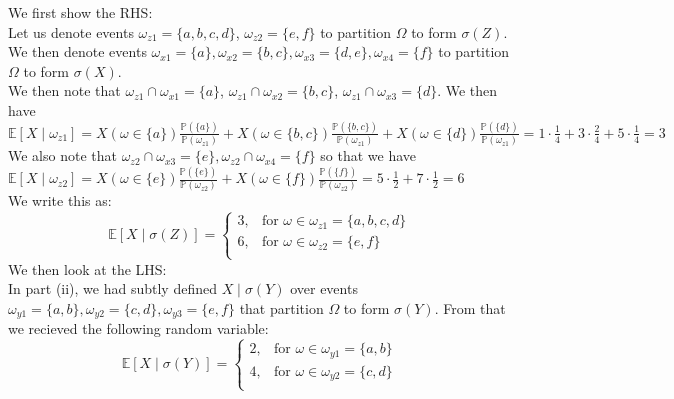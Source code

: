 \documentclass[12pt,twoside, letter]{exam}
\theoremstyle{definition}
\newcommand{\ee}{\mathbb{E}}
\newcommand{\pp}{\mathbb{P}}
\begin{document}
\begin{enumerate}
    \begin{solution}
      We first show the RHS: \\
      Let us denote events $\omega_{z1} = \{a,b,c,d\}$, $\omega_{z2} = \{e,f\}$ to partition $\Omega$ to form $\sigma(Z)$.
      We then denote events $\omega_{x1} = \{a\}, \omega_{x2} = \{b,c\}, \omega_{x3} = \{d,e\}, \omega_{x4} = \{f\}$ to partition $\Omega$ to form $\sigma(X)$. \\
      We then note that $\omega_{z1}\cap\omega_{x1} = \{a\}$, $\omega_{z1}\cap\omega_{x2} = \{b,c\}$, $\omega_{z1}\cap\omega_{x3} = \{d\}$. We then have \\
      $\ee[X \mid \omega_{z1}] = X(\omega \in \{a\})\frac{\pp(\{a\})}{\pp(\omega_{z1})} + X(\omega \in \{b,c\})\frac{\pp(\{b,c\})}{\pp(\omega_{z1})} +
      X(\omega \in \{d\})\frac{\pp(\{d\})}{\pp(\omega_{z1})} = 1\cdot \frac{1}{4} + 3\cdot \frac{2}{4} + 5\cdot \frac{1}{4} = 3$ \\
      We also note that $\omega_{z2} \cap \omega_{x3} = \{e\}, \omega_{z2} \cap \omega_{x4} = \{f\}$ so that we have \\
      $\ee[X \mid \omega_{z2}] = X(\omega \in \{e\})\frac{\pp(\{e\})}{\pp(\omega_{z2})} + X(\omega \in \{f\})\frac{\pp(\{f\})}{\pp(\omega_{z2})}
      = 5\cdot \frac{1}{2} + 7 \cdot \frac{1}{2} = 6$ \\
      We write this as:
        \begin{equation*}
          \ee[X \mid \sigma(Z)] =
            \begin{cases}
              3, & \text{for } \omega \in \omega_{z1} = \{a,b,c,d\} \\
              6, & \text{for } \omega \in \omega_{z2} = \{e,f\} \\
            \end{cases}
        \end{equation*}
      We then look at the LHS: \\
      In part (ii), we had subtly defined $X \mid \sigma(Y)$ over events $\omega_{y1} = \{a,b\}, \omega_{y2} = \{c,d\}, \omega_{y3} = \{e,f\}$ that partition $\Omega$ to form $\sigma(Y)$.
      From that we recieved the following random variable:
        \begin{equation*}
          \ee[X \mid \sigma(Y)] =
            \begin{cases}
              2, & \text{for } \omega \in \omega_{y1} = \{a,b\} \\
              4, & \text{for } \omega \in \omega_{y2} = \{c,d\} \\

\end{cases}
\end{equation*}
\end{solution}
\end{enumerate}
\end{document}
